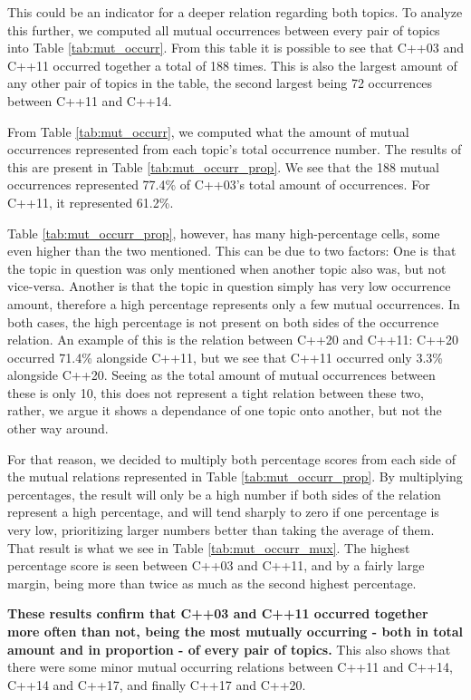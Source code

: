 This could be an indicator for a deeper relation regarding both topics. To analyze this further, we computed all mutual occurrences between every pair of topics into Table \ref{tab:mut_occurr}. From this table it is possible to see that C++03 and C++11 occurred together a total of 188 times. This is also the largest amount of any other pair of topics in the table, the second largest being 72 occurrences between C++11 and C++14.

From Table \ref{tab:mut_occurr}, we computed what the amount of mutual occurrences represented from each topic's total occurrence number. The results of this are present in Table \ref{tab:mut_occurr_prop}. We see that the 188 mutual occurrences represented 77.4\% of C++03's total amount of occurrences. For C++11, it represented 61.2\%.

Table \ref{tab:mut_occurr_prop}, however, has many high-percentage cells, some even higher than the two mentioned. This can be due to two factors: One is that the topic in question was only mentioned when another topic also was, but not vice-versa. Another is that the topic in question simply has very low occurrence amount, therefore a high percentage represents only a few mutual occurrences. In both cases, the high percentage is not present on both sides of the occurrence relation. An example of this is the relation between C++20 and C++11: C++20 occurred 71.4\% alongside C++11, but we see that C++11 occurred only 3.3\% alongside C++20. Seeing as the total amount of mutual occurrences between these is only 10, this does not represent a tight relation between these two, rather, we argue it shows a dependance of one topic onto another, but not the other way around.

For that reason, we decided to multiply both percentage scores from each side of the mutual relations represented in Table \ref{tab:mut_occurr_prop}. By multiplying percentages, the result will only be a high number if both sides of the relation represent a high percentage, and will tend sharply to zero if one percentage is very low, prioritizing larger numbers better than taking the average of them. That result is what we see in Table \ref{tab:mut_occurr_mux}. The highest percentage score is seen between C++03 and C++11, and by a fairly large margin, being more than twice as much as the second highest percentage.

\textbf{These results confirm that C++03 and C++11 occurred together more often than not, being the most mutually occurring - both in total amount and in proportion - of every pair of topics.} This also shows that there were some minor mutual occurring relations between C++11 and C++14, C++14 and C++17, and finally C++17 and C++20.



